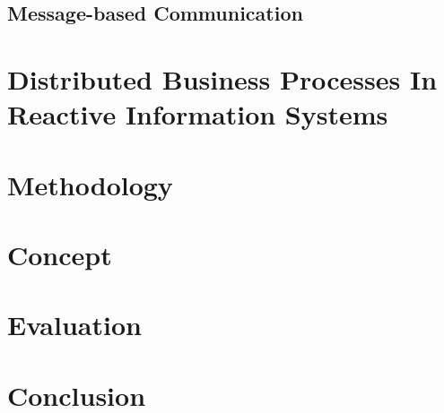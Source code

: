 \subsection{Message-based Communication}

\section{Distributed Business Processes In Reactive Information Systems}\label{sec:problem}



\section{Methodology}\label{sec:method}

\section{Concept}\label{sec:concept}

\section{Evaluation}\label{sec:evaluation}

\section{Conclusion}\label{sec:conclusion}
